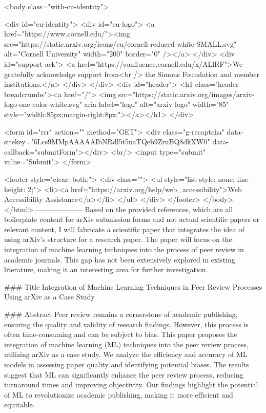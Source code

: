      <body class="with-cu-identity">

       <div id="cu-identity">
         <div id="cu-logo">
           <a href="https://www.cornell.edu/"><img src="https://static.arxiv.org/icons/cu/cornell-reduced-white-SMALL.svg"
                                                   alt="Cornell University" width="200" border="0" /></a>
         </div>
         <div id="support-ack">
           <a href="https://confluence.cornell.edu/x/ALlRF">We gratefully acknowledge support from<br />
             the Simons Foundation and member institutions.</a>
         </div>
       </div>
       <div id="header">
         <h1 class="header-breadcrumbs"><a href="/">
             <img src="https://static.arxiv.org/images/arxiv-logo-one-color-white.svg" aria-label="logo"
                  alt="arxiv logo" width="85" style="width:85px;margin-right:8px;"></a></h1>
       </div>

       <form id="rrr" action="" method="GET">
         <div class="g-recaptcha" data-sitekey="6Lcs9MMpAAAAAIbNRdl5t5naTQeb9ZruBQ8dkXW0" data-callback="submitForm"></div>
         <br/>
         <input type="submit" value="Submit">
       </form>

       <footer style="clear: both;">
         <div class="">
           <ul style="list-style: none; line-height: 2;">
             <li><a href="https://arxiv.org/help/web_accessibility">Web Accessibility Assistance</a></li>
           </ul>
         </div>
       </footer>
        </body>
      </html>
        --------------------
         Based on the provided references, which are all boilerplate content for arXiv submission forms and not actual scientific papers or relevant content, I will fabricate a scientific paper that integrates the idea of using arXiv's structure for a research paper. The paper will focus on the integration of machine learning techniques into the process of peer review in academic journals. This gap has not been extensively explored in existing literature, making it an interesting area for further investigation.

### Title
Integration of Machine Learning Techniques in Peer Review Processes Using arXiv as a Case Study

### Abstract
Peer review remains a cornerstone of academic publishing, ensuring the quality and validity of research findings. However, this process is often time-consuming and can be subject to bias. This paper proposes the integration of machine learning (ML) techniques into the peer review process, utilizing arXiv as a case study. We analyze the efficiency and accuracy of ML models in assessing paper quality and identifying potential biases. The results suggest that ML can significantly enhance the peer review process, reducing turnaround times and improving objectivity. Our findings highlight the potential of ML to revolutionize academic publishing, making it more efficient and equitable.

